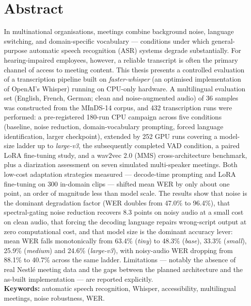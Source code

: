 \documentclass[12pt]{report}
\begin{document}
\section*{Abstract}
In multinational organisations, meetings combine background noise, language switching, and domain-specific vocabulary --- conditions under which general-purpose automatic speech recognition (ASR) systems degrade substantially. For hearing-impaired employees, however, a reliable transcript is often the primary channel of access to meeting content. This thesis presents a controlled evaluation of a transcription pipeline built on \textit{faster-whisper} (an optimised implementation of OpenAI's Whisper) running on CPU-only hardware. A multilingual evaluation set (English, French, German; clean and noise-augmented audio) of 36 samples was constructed from the MInDS-14 corpus, and 432 transcription runs were performed: a pre-registered 180-run CPU campaign across five conditions (baseline, noise reduction, domain-vocabulary prompting, forced language identification, larger checkpoint), extended by 252 GPU runs covering a model-size ladder up to \textit{large-v3}, the subsequently completed VAD condition, a paired LoRA fine-tuning study, and a wav2vec 2.0 (MMS) cross-architecture benchmark, plus a diarization assessment on seven simulated multi-speaker meetings. Both low-cost adaptation strategies measured --- decode-time prompting and LoRA fine-tuning on 300 in-domain clips --- shifted mean WER by only about one point, an order of magnitude less than model scale. The results show that noise is the dominant degradation factor (WER doubles from 47.0\% to 96.4\%), that spectral-gating noise reduction recovers 8.3 points on noisy audio at a small cost on clean audio, that forcing the decoding language repairs wrong-script output at zero computational cost, and that model size is the dominant accuracy lever: mean WER falls monotonically from 63.4\% (\textit{tiny}) to 48.3\% (\textit{base}), 33.3\% (\textit{small}), 25.9\% (\textit{medium}) and 24.6\% (\textit{large-v3}), with noisy-audio WER dropping from 88.1\% to 40.7\% across the same ladder. Limitations --- notably the absence of real Nestlé meeting data and the gaps between the planned architecture and the as-built implementation --- are reported explicitly.
\\
\textbf{Keywords:} automatic speech recognition, Whisper, accessibility, multilingual meetings, noise robustness, WER.
\thispagestyle{fancy}
\setcounter{page}{6}
\newpage
{}
\setcounter{page}{7}
\thispagestyle{fancy}
\newpage
\listoffigures
\thispagestyle{fancy}
\newpage
\listoftables
\thispagestyle{fancy}
\newpage
{}
\end{document}
